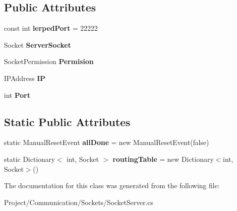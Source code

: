 \subsection*{Public Attributes}
\begin{DoxyCompactItemize}
\item 
\mbox{\label{class_lerp2_a_p_i_1_1_communication_1_1_sockets_1_1_socket_server_a328c288869b36a51ac4c9f487d217b17}} 
const int {\bfseries lerped\+Port} = 22222
\item 
\mbox{\label{class_lerp2_a_p_i_1_1_communication_1_1_sockets_1_1_socket_server_a4b43a53f464cd78aa9656f7dacce5319}} 
Socket {\bfseries Server\+Socket}
\item 
\mbox{\label{class_lerp2_a_p_i_1_1_communication_1_1_sockets_1_1_socket_server_a5671ae3a7409a4158f1aa42533f0c05a}} 
Socket\+Permission {\bfseries Permision}
\item 
\mbox{\label{class_lerp2_a_p_i_1_1_communication_1_1_sockets_1_1_socket_server_a1d51d98aa8ca2a0d5c91611351bf65a6}} 
I\+P\+Address {\bfseries IP}
\item 
\mbox{\label{class_lerp2_a_p_i_1_1_communication_1_1_sockets_1_1_socket_server_aaa355d9123cd02dc8a064555989c8038}} 
int {\bfseries Port}
\end{DoxyCompactItemize}
\subsection*{Static Public Attributes}
\begin{DoxyCompactItemize}
\item 
\mbox{\label{class_lerp2_a_p_i_1_1_communication_1_1_sockets_1_1_socket_server_a89a4f48a027923ed2ebadb582c3cabb0}} 
static Manual\+Reset\+Event {\bfseries all\+Done} = new Manual\+Reset\+Event(false)
\item 
\mbox{\label{class_lerp2_a_p_i_1_1_communication_1_1_sockets_1_1_socket_server_aa63dac3e74b7b57c4cf1762ed636f605}} 
static Dictionary$<$ int, Socket $>$ {\bfseries routing\+Table} = new Dictionary$<$int, Socket$>$()
\end{DoxyCompactItemize}


The documentation for this class was generated from the following file\+:\begin{DoxyCompactItemize}
\item 
Project/\+Communication/\+Sockets/Socket\+Server.\+cs\end{DoxyCompactItemize}
